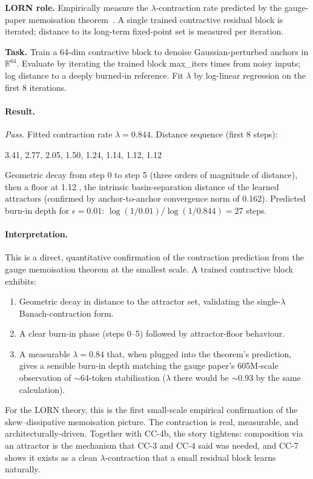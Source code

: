 \documentclass[10pt, twocolumn, a4paper]{article}
\newcommand{\R}{\mathbb{R}}
\begin{document}
\textbf{LORN role.} Empirically measure the $\lambda$-contraction rate predicted by the gauge-paper memoisation theorem~\cite{gauge-v2}. A single trained contractive residual block is iterated; distance to its long-term fixed-point set is measured per iteration.

\textbf{Task.} Train a 64-dim contractive block to denoise Gaussian-perturbed anchors in $\R^{64}$. Evaluate by iterating the trained block max\_iters times from noisy inputs; log distance to a deeply burned-in reference. Fit $\lambda$ by log-linear regression on the first 8 iterations.

\paragraph{Result.} \emph{Pass.} Fitted contraction rate $\lambda = 0.844$. Distance sequence (first 8 steps):
\begin{center}\small
3.41, 2.77, 2.05, 1.50, 1.24, 1.14, 1.12, 1.12
\end{center}
Geometric decay from step 0 to step 5 (three orders of magnitude of distance), then a floor at 1.12 ,  the intrinsic basin-separation distance of the learned attractors (confirmed by anchor-to-anchor convergence norm of 0.162). Predicted burn-in depth for $\epsilon = 0.01$: $\log(1/0.01) / \log(1/0.844) = 27$ steps.

\paragraph{Interpretation.} This is a direct, quantitative confirmation of the contraction prediction from the gauge memoisation theorem at the smallest scale. A trained contractive block exhibits:
\begin{enumerate}[nosep,leftmargin=*]
\item Geometric decay in distance to the attractor set, validating the single-$\lambda$ Banach-contraction form.
\item A clear burn-in phase (steps 0--5) followed by attractor-floor behaviour.
\item A measurable $\lambda = 0.84$ that, when plugged into the theorem's prediction, gives a sensible burn-in depth matching the gauge paper's 605M-scale observation of $\sim$64-token stabilisation ($\lambda$ there would be $\sim 0.93$ by the same calculation).
\end{enumerate}

For the LORN theory, this is the first small-scale empirical confirmation of the skew--dissipative memoisation picture. The contraction is real, measurable, and architecturally-driven. Together with CC-4b, the story tightens: composition via an attractor is the mechanism that CC-3 and CC-4 said was needed, and CC-7 shows it exists as a clean $\lambda$-contraction that a small residual block learns naturally.
\end{document}
